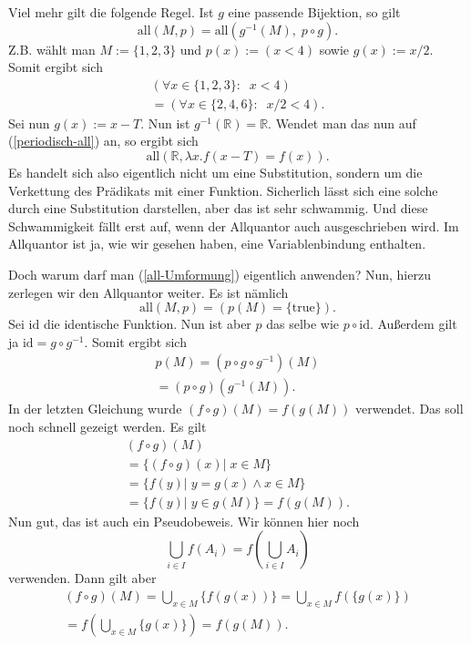 \documentclass[a4paper,10pt,fleqn,twocolumn,twoside]{article}
\begin{document}
Viel mehr gilt die folgende Regel. Ist $g$ eine passende
Bijektion, so gilt
\begin{equation}\label{all-Umformung}
\mathrm{all}(M,p) = \mathrm{all}(g^{-1}(M),\;p\circ g).
\end{equation}
Z.B. wählt man $M:=\{1,2,3\}$ und $p(x):=(x{<}4)$
sowie $g(x):=x/2$. Somit ergibt sich
\begin{gather*}
(\forall x{\in}\{1,2,3\}{:}\;\; x<4)\\
= (\forall x{\in}\{2,4,6\}{:}\;\; x/2<4).
\end{gather*}
Sei nun $g(x):=x-T$. Nun ist $g^{-1}(\mathbb R)=\mathbb R$.
Wendet man das nun auf (\ref{periodisch-all}) an, so ergibt
sich
\begin{equation}
\mathrm{all}(\mathbb R, \lambda x.f(x-T)=f(x)).
\end{equation}
Es handelt sich also eigentlich nicht um eine Substitution,
sondern um die Verkettung des Prädikats mit einer Funktion.
Sicherlich lässt sich eine solche durch eine Substitution
darstellen, aber das ist sehr schwammig. Und diese Schwammigkeit
fällt erst auf, wenn der Allquantor auch ausgeschrieben wird.
Im Allquantor ist ja, wie wir gesehen haben, eine Variablenbindung
enthalten.

Doch warum darf man (\ref{all-Umformung}) eigentlich anwenden?
Nun, hierzu zerlegen wir den Allquantor weiter. Es ist nämlich
\begin{equation}
\mathrm{all}(M,p) = (p(M)=\{\mathrm{true}\}).
\end{equation}
Sei $\mathrm{id}$ die identische Funktion. Nun ist aber
$p$ das selbe wie $p\circ \mathrm{id}$. Außerdem gilt ja
$\mathrm{id} = g\circ g^{-1}$. Somit ergibt sich
\begin{gather*}
p(M) = (p\circ g\circ g^{-1})(M)\\
= (p\circ g)(g^{-1}(M)).
\end{gather*}
In der letzten Gleichung wurde $(f\circ g)(M)=f(g(M))$
verwendet. Das soll noch schnell gezeigt werden. Es gilt
\begin{gather*}
(f\circ g)(M)\\
= \{(f\circ g)(x)|\;x\in M\}\\
= \{f(y)|\; y=g(x) \wedge x\in M\}\\
= \{f(y)|\; y\in g(M)\}
= f(g(M)).
\end{gather*}
Nun gut, das ist auch ein Pseudobeweis. Wir können hier noch
\begin{equation}
\bigcup_{i\in I} f(A_i)
= f(\bigcup_{i\in I} A_i)
\end{equation}
verwenden. Dann gilt aber
\begin{gather*}
(f\circ g)(M) = \bigcup_{x\in M} \{f(g(x))\}
= \bigcup_{x\in M} f(\{g(x)\})\\
= f(\bigcup_{x\in M}\{g(x)\})
= f(g(M)).
\end{gather*}
\end{document}
